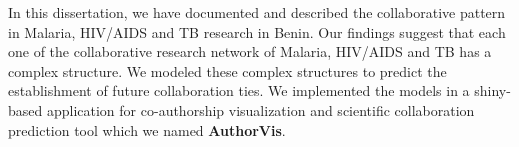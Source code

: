 
\clearpage  %
In this dissertation, we have documented and described the collaborative pattern in Malaria, HIV/AIDS and TB research in Benin. Our findings suggest that each one of the collaborative research network of Malaria, HIV/AIDS and TB has a complex structure. We modeled these complex structures to predict the establishment of future collaboration ties. We implemented the models in a shiny-based application for co-authorship visualization and scientific collaboration prediction tool which we named \textbf{AuthorVis}.

